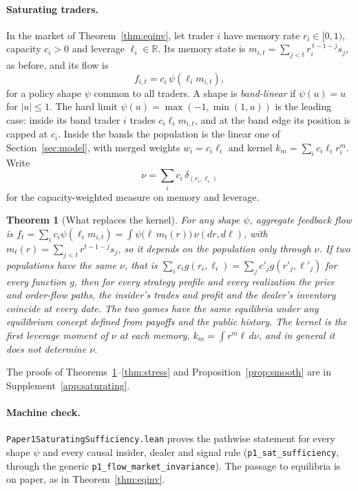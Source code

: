 \documentclass[12pt]{article}
\newtheorem{theorem}{Theorem}[section]
\theoremstyle{definition}
\theoremstyle{remark}
\begin{document}
\paragraph{Saturating traders.} In the market of Theorem~\ref{thm:eqinv}, let trader $i$ have memory rate $r_i\in[0,1)$, capacity $c_i>0$ and leverage $\ell_i\in\mathbb R$. Its memory state is $m_{i,t}=\sum_{j<t}r_i^{\,t-1-j}s_j$, as before, and its flow is
\[
 f_{i,t}=c_i\,\psi(\ell_i m_{i,t}),
\]
for a policy shape $\psi$ common to all traders. A shape is \emph{band-linear} if $\psi(u)=u$ for $|u|\le1$. The hard limit $\psi(u)=\max(-1,\min(1,u))$ is the leading case: inside its band trader $i$ trades $c_i\ell_im_{i,t}$, and at the band edge its position is capped at $c_i$. Inside the bands the population is the linear one of Section~\ref{sec:model}, with merged weights $w_i=c_i\ell_i$ and kernel $k_m=\sum_ic_i\ell_ir_i^m$. Write
\[
 \nu=\sum_ic_i\,\delta_{(r_i,\ell_i)}
\]
for the capacity-weighted measure on memory and leverage.

\begin{theorem}[What replaces the kernel]\label{thm:satsuff}
For any shape $\psi$, aggregate feedback flow is $f_t=\sum_ic_i\psi(\ell_im_{i,t})=\int\psi\bigl(\ell\,m_t(r)\bigr)\,\nu(dr,d\ell)$, with $m_t(r)=\sum_{j<t}r^{t-1-j}s_j$, so it depends on the population only through $\nu$. If two populations have the same $\nu$, that is $\sum_ic_ig(r_i,\ell_i)=\sum_jc'_jg(r'_j,\ell'_j)$ for every function $g$, then for every strategy profile and every realization the price and order-flow paths, the insider's trades and profit and the dealer's inventory coincide at every date. The two games have the same equilibria under any equilibrium concept defined from payoffs and the public history. The kernel is the first leverage moment of $\nu$ at each memory, $k_m=\int r^m\ell\,d\nu$, and in general it does not determine $\nu$.
\end{theorem}


The proofs of Theorems~\ref{thm:satsuff}--\ref{thm:stress} and Proposition~\ref{prop:smooth} are in Supplement~\ref{app:saturating}.

\paragraph{Machine check.} \nolinkurl{Paper1SaturatingSufficiency.lean} proves the pathwise statement for every shape $\psi$ and every causal insider, dealer and signal rule (\texttt{p1\_sat\_sufficiency}, through the generic \texttt{p1\_flow\_market\_invariance}). The passage to equilibria is on paper, as in Theorem~\ref{thm:eqinv}.
\end{document}
